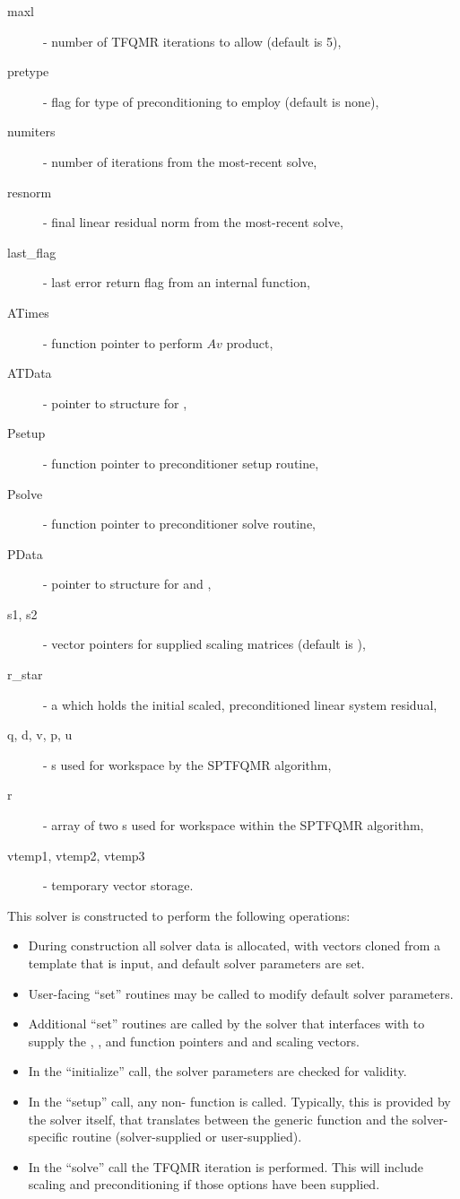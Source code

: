 \begin{description}
  \item[maxl] - number of TFQMR iterations to allow (default is 5),
  \item[pretype] - flag for type of preconditioning to employ
    (default is none),
  \item[numiters] - number of iterations from the most-recent solve,
  \item[resnorm] - final linear residual norm from the most-recent solve,
  \item[last\_flag] - last error return flag from an internal function,
  \item[ATimes] - function pointer to perform $Av$ product,
  \item[ATData] - pointer to structure for ,
  \item[Psetup] - function pointer to preconditioner setup routine,
  \item[Psolve] - function pointer to preconditioner solve routine,
  \item[PData] - pointer to structure for  and ,
  \item[s1, s2] - vector pointers for supplied scaling matrices
    (default is ),
  \item[r\_star] - a {\nvector} which holds the initial scaled,
    preconditioned linear system residual,
  \item[q, d, v, p, u] - {\nvector}s used for workspace by the SPTFQMR
    algorithm,
  \item [r] - array of two {\nvector}s used for workspace within the
    SPTFQMR algorithm,
  \item[vtemp1, vtemp2, vtemp3] - temporary vector storage.
\end{description}

This solver is constructed to perform the following operations:
\begin{itemize}
\item During construction all {\nvector} solver data is allocated,
  with vectors cloned from a template {\nvector} that is input, and
  default solver parameters are set.
\item User-facing ``set'' routines may be called to modify default
  solver parameters.
\item Additional ``set'' routines are called by the {\sundials} solver
  that interfaces with {\sunlinsolsptfqmr} to supply the 
  , , and  function pointers and
   and  scaling vectors.
\item In the ``initialize'' call, the solver parameters are checked
  for validity.
\item In the ``setup'' call, any non- 
   function is called.  Typically, this is provided by
  the {\sundials} solver itself, that translates between the
  generic  function and the
  solver-specific routine (solver-supplied or user-supplied).
\item In the ``solve'' call the TFQMR iteration is performed.  This
  will include scaling and preconditioning if those options have been
  supplied.
\end{itemize}

